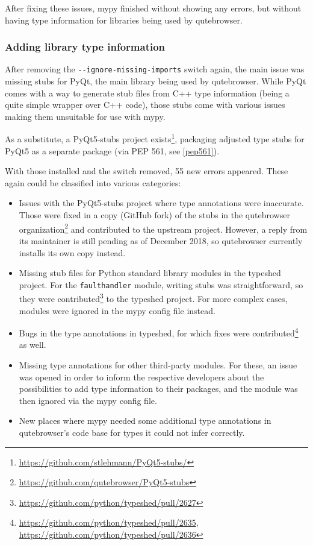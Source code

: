 After fixing these issues, mypy finished without showing any errors, but without
having type information for libraries being used by qutebrowser.

\subsubsection{Adding library type information}

After removing the \verb|--ignore-missing-imports| switch again, the main issue
was missing stubs for PyQt, the main library being used by qutebrowser. While
PyQt comes with a way to generate stub files from C++ type information (being a
quite simple wrapper over C++ code), those stubs come with various issues making
them unsuitable for use with mypy.

As a substitute, a PyQt5-stubs project
exists\footnote{\url{https://github.com/stlehmann/PyQt5-stubs/}}, packaging
adjusted type stubs for PyQt5 as a separate package (via PEP 561, see
\ref{pep561}).

With those installed and the switch removed, 55 new errors appeared. These again
could be classified into various categories:

\begin{itemize}
  \item Issues with the PyQt5-stubs project where type annotations were
    inaccurate. Those were fixed in a copy (GitHub fork) of the stubs in the
    qutebrowser
    organization\footnote{\url{https://github.com/qutebrowser/PyQt5-stubs}} and
    contributed to the upstream project. However, a reply from its maintainer is
    still pending as of December 2018, so qutebrowser currently installs its own
    copy instead.
  \item Missing stub files for Python standard library modules in the typeshed
    project. For the \verb|faulthandler| module, writing stubs was
    straightforward, so they were
    contributed\footnote{\url{https://github.com/python/typeshed/pull/2627}} to
    the typeshed project. For more complex cases, modules were ignored in
    the mypy config file instead.
  \item Bugs in the type annotations in typeshed, for which fixes were
    contributed\footnote{\url{https://github.com/python/typeshed/pull/2635}, \\
      \url{https://github.com/python/typeshed/pull/2636}} as well.
  \item Missing type annotations for other third-party modules. For these, an
    issue was opened in order to inform the respective developers about the
    possibilities to add type information to their packages, and the module was
    then ignored via the mypy config file.
  \item New places where mypy needed some additional type annotations in
    qutebrowser's code base for types it could not infer correctly.
\end{itemize}

